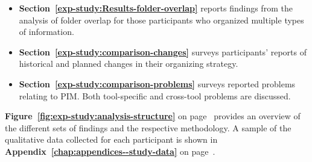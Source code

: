 \begin{itemize}
\item \textbf{Section~\ref{exp-study:Results-folder-overlap}} reports findings from the analysis of folder overlap for those participants who organized multiple types of information.

\item \textbf{Section~\ref{exp-study:comparison-changes}} surveys participants' reports of historical and planned changes in their organizing strategy.

\item \textbf{Section~\ref{exp-study:comparison-problems}} surveys reported problems relating to PIM.  Both tool-specific and cross-tool problems are discussed.

\end{itemize}

\textbf{Figure~\ref{fig:exp-study:analysis-structure}} on page~\pageref{fig:exp-study:analysis-structure} provides an overview of the different sets of findings and the respective methodology.
A sample of the qualitative data collected for each participant is shown in \textbf{Appendix~\ref{chap:appendices--study-data}} on page~\pageref{chap:appendices--study-data:exp-study}.
 


